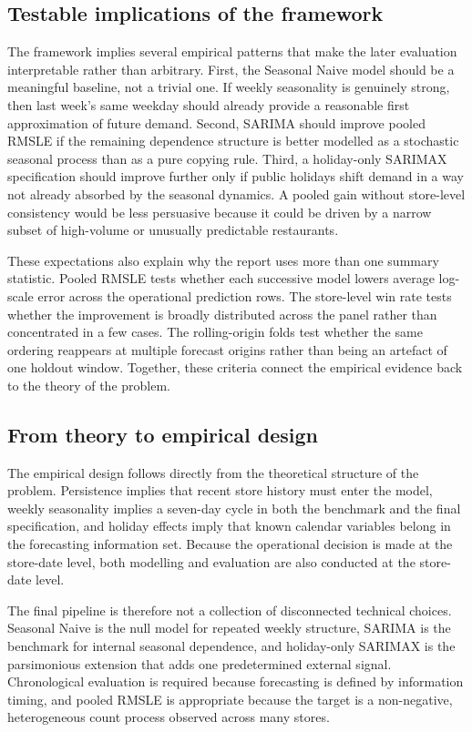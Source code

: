 \documentclass[11pt,oneside]{scrartcl}
\begin{document}
\subsection{Testable implications of the framework}
The framework implies several empirical patterns that make the later evaluation interpretable rather than arbitrary. First, the Seasonal Naive model should be a meaningful baseline, not a trivial one. If weekly seasonality is genuinely strong, then last week's same weekday should already provide a reasonable first approximation of future demand. Second, SARIMA should improve pooled RMSLE if the remaining dependence structure is better modelled as a stochastic seasonal process than as a pure copying rule. Third, a holiday-only SARIMAX specification should improve further only if public holidays shift demand in a way not already absorbed by the seasonal dynamics. A pooled gain without store-level consistency would be less persuasive because it could be driven by a narrow subset of high-volume or unusually predictable restaurants.

These expectations also explain why the report uses more than one summary statistic. Pooled RMSLE tests whether each successive model lowers average log-scale error across the operational prediction rows. The store-level win rate tests whether the improvement is broadly distributed across the panel rather than concentrated in a few cases. The rolling-origin folds test whether the same ordering reappears at multiple forecast origins rather than being an artefact of one holdout window. Together, these criteria connect the empirical evidence back to the theory of the problem.

\subsection{From theory to empirical design}
The empirical design follows directly from the theoretical structure of the problem. Persistence implies that recent store history must enter the model, weekly seasonality implies a seven-day cycle in both the benchmark and the final specification, and holiday effects imply that known calendar variables belong in the forecasting information set. Because the operational decision is made at the store-date level, both modelling and evaluation are also conducted at the store-date level.

The final pipeline is therefore not a collection of disconnected technical choices. Seasonal Naive is the null model for repeated weekly structure, SARIMA is the benchmark for internal seasonal dependence, and holiday-only SARIMAX is the parsimonious extension that adds one predetermined external signal. Chronological evaluation is required because forecasting is defined by information timing, and pooled RMSLE is appropriate because the target is a non-negative, heterogeneous count process observed across many stores.
\end{document}
